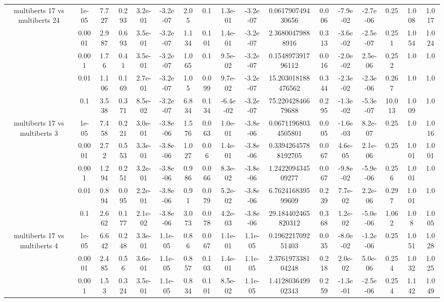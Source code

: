 \begin{tabular}{|c|c|c|c|c|c|c|c|c|c|c|c|c|c|c|c|c|}
\hline
\multirow{5}{*}{multiberts 17 vs multiberts 24} & 1e-05 & 7.727 & 0.293 & 3.2e-01 & -3.2e-07 & 2.05 & 0.1 & 1.3e-01 & -3.2e-07 & 0.061790749430656 & 0.006 & -7.9e-02 & -2.7e-06 & 0.25 & 1.008 & 1.017 \\
 & 0.0001 & 2.987 & 0.693 & 3.5e-01 & -3.2e-07 & 1.134 & 0.101 & 1.4e-01 & -3.2e-07 & 2.36800479888916 & 0.313 & -3.6e-02 & -2.5e-07 & 0.251 & 1.054 & 1.024 \\
 & 0.001 & 1.76 & 0.41 & 3.5e-01 & -3.2e-07 & 1.065 & 0.1 & 9.5e-02 & -3.2e-07 & 0.154897391796112 & 0.016 & -2.0e-02 & 2.5e-06 & 0.252 & 1.0 & 1.0 \\
 & 0.01 & 1.106 & 0.169 & 2.7e-01 & -3.2e-07 & 1.05 & 0.099 & 9.7e-02 & -3.2e-07 & 15.203018188476562 & 0.344 & -2.3e-02 & -2.3e-06 & 0.267 & 1.0 & 1.0 \\
 & 0.1 & 3.538 & 0.371 & 8.5e-02 & -3.2e-07 & 6.834 & 0.134 & -6.4e-02 & -3.2e-07 & 75.22042846679688 & 0.295 & -1.3e-02 & -5.3e-07 & 10.013 & 1.009 & 1.0 \\
\hline
\multirow{5}{*}{multiberts 17 vs multiberts 3} & 1e-05 & 7.458 & 0.221 & 3.0e-01 & -3.8e-06 & 1.576 & 0.063 & 1.0e-01 & -3.8e-06 & 0.06711968034505801 & 0.005 & -1.6e-03 & 8.2e-07 & 0.25 & 1.0 & 1.016 \\
 & 0.0001 & 2.72 & 0.553 & 3.3e-01 & -3.8e-06 & 1.027 & 0.06 & 1.4e-01 & -3.8e-06 & 0.33942645788192705 & 0.067 & 4.6e-05 & 2.1e-06 & 0.25 & 1.001 & 1.001 \\
 & 0.001 & 1.294 & 0.251 & 3.2e-01 & -3.8e-06 & 0.986 & 0.066 & 8.3e-02 & -3.8e-06 & 1.242209434509277 & 0.067 & -9.8e-02 & -5.9e-06 & 0.256 & 1.001 & 1.0 \\
 & 0.01 & 0.894 & 0.095 & 2.2e-01 & -3.8e-06 & 0.91 & 0.079 & 5.2e-02 & -3.8e-06 & 6.762416839599609 & 0.239 & 7.7e-02 & 2.2e-06 & 0.297 & 1.001 & 1.0 \\
 & 0.1 & 2.662 & 0.177 & 2.1e-02 & -3.8e-06 & 3.073 & 0.078 & 4.2e-03 & -3.8e-06 & 29.184402465820312 & 0.368 & 1.2e-02 & -5.0e-06 & 1.062 & 1.08 & 1.005 \\
\hline
\multirow{5}{*}{multiberts 17 vs multiberts 4} & 1e-05 & 6.642 & 0.248 & 3.3e-01 & 1.1e-05 & 0.86 & 0.067 & 1.1e-01 & 1.1e-05 & 0.196221709251403 & 0.035 & -8.0e-02 & -1.2e-06 & 0.25 & 1.051 & 1.028 \\
 & 0.0001 & 2.485 & 0.56 & 3.6e-01 & 1.1e-05 & 0.857 & 0.103 & 1.4e-01 & 1.1e-05 & 2.376197338104248 & 0.218 & 2.0e-02 & 5.0e-06 & 0.254 & 1.032 & 1.025 \\
 & 0.001 & 1.53 & 0.324 & 3.5e-01 & 1.1e-05 & 0.834 & 0.101 & 8.5e-02 & 1.1e-05 & 1.412803649902343 & 0.259 & -1.3e-01 & -2.5e-06 & 0.254 & 1.142 & 1.049 \\

\end{tabular}
